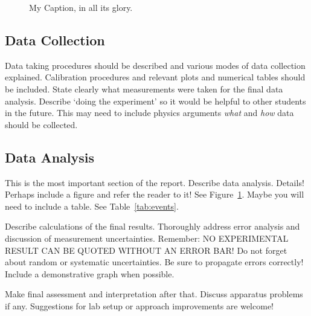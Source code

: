 \documentclass[10pt,letterpaper,onecolumn]{article}
\begin{document}
\begin{figure}[h]
 \begin{center}
 \caption{ My Caption, in all its glory.\label{fig:apparatus} }
 \end{center}
\end{figure}

\subsection{Data Collection}

Data taking procedures should be described and various modes of
data collection explained. Calibration procedures and
relevant plots and numerical tables should be included.
State clearly what measurements were taken for the final
data analysis. Describe `doing the experiment' so it would
be helpful to other students in the future. This may need
to include physics arguments {\em what } and {\em how } data should
be collected.


\subsection{Data Analysis}

This is the most important section of the report.
Describe data analysis. Details! Perhaps include a figure and refer
the reader to it! See Figure~\ref{fig:apparatus}. Maybe you will need
to include a table. See Table~\ref{tab:events}.

Describe calculations of the final results.
Thoroughly address error analysis and discussion of measurement
uncertainties. Remember: NO EXPERIMENTAL RESULT CAN BE QUOTED
WITHOUT AN ERROR BAR! Do not forget about random or systematic
uncertainties. Be sure to propagate errors correctly!
Include a demonstrative graph when possible.


Make final assessment and interpretation after that.
Discuss apparatus problems if any. Suggestions for
lab setup or approach improvements are welcome!

\end{document}
